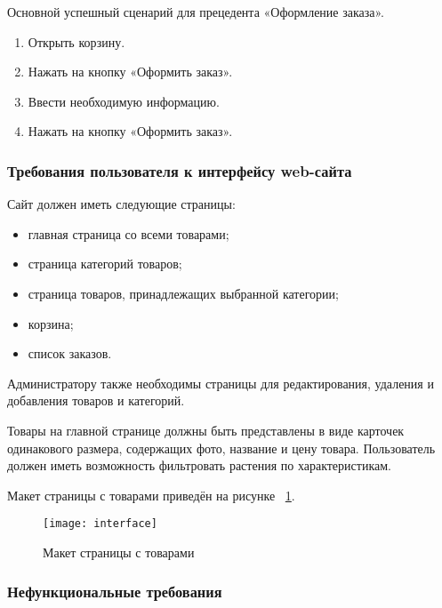 Основной успешный сценарий для прецедента «Оформление заказа».
\begin{enumerate}
	\item Открыть корзину.
	\item Нажать на кнопку «Оформить заказ».
	\item Ввести необходимую информацию.
	\item Нажать на кнопку «Оформить заказ».
\end{enumerate}

\subsubsection{Требования пользователя к интерфейсу web-сайта}

Сайт должен иметь следующие страницы:
\begin{itemize}
	\item главная страница со всеми товарами;
	\item страница категорий товаров;
	\item страница товаров, принадлежащих выбранной категории;
	\item корзина;
	\item список заказов.
\end{itemize}

Администратору также необходимы страницы для редактирования, удаления и добавления товаров и категорий.

Товары на главной странице должны быть представлены в виде карточек одинакового размера, содержащих фото, название и цену товара. Пользователь должен иметь возможность фильтровать растения по характеристикам.

Макет страницы с товарами приведён на рисунке ~\ref{interface:image}.

\begin{figure}[H]
	\texttt{[image: interface]}
	\caption{Макет страницы с товарами}
	\label{interface:image}
\end{figure}

\subsubsection{Нефункциональные требования}


